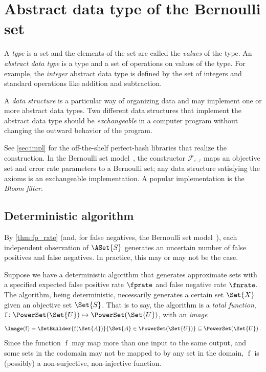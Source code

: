 \documentclass[ ../main.tex]{subfiles}
\begin{document}
\section{Abstract data type of the Bernoulli set}
\label{sec:adt}
A \emph{type} is a set and the elements of the set are called the \emph{values} 
of the type. An \emph{abstract data type} is a type and a set of operations on 
values of the type. For example, the \emph{integer} abstract data type is 
defined by the set of integers and standard operations like addition and 
subtraction.

A \emph{data structure} is a particular way of organizing data and may 
implement one or more abstract data types. Two different data structures that 
implement the abstract data type should be \emph{exchangeable} in a computer
program without changing the outward behavior of the program.

See \cref{sec:impl} for the off-the-shelf perfect-hash libraries that realize
the construction. In the Bernoulli set model~\cite{bsets}, the
constructor $\mathcal{F}_{\varepsilon,\tau}$ maps an objective set and error
rate parameters to a Bernoulli set; any data structure satisfying the axioms is
an exchangeable implementation. A popular implementation is the \emph{Bloom
filter}.

\subsection{Deterministic algorithm}
By \cref{thm:fp_rate} (and, for false negatives, the Bernoulli set
model~\cite{bsets}), each independent observation of $\ASet{S}$ generates
an uncertain number of false positives and false negatives. In practice, this
may or may not be the case.

Suppose we have a deterministic algorithm that generates approximate sets with 
a specified expected false positive rate $\fprate$ and false negative rate 
$\fnrate$. The algorithm, being deterministic, necessarily generates a certain 
set $\Set{X}$ given an objective set $\Set{S}$. That is to say, the algorithm 
is a \emph{total function},
	$\operatorname{f} \colon \PowerSet(\Set{U}) \mapsto \PowerSet(\Set{U})$,
with an \emph{image}
\begin{equation}
\Image(\operatorname{f}) = 
    \SetBuilder{\operatorname{f}(\Set{A})}{\Set{A} \in \PowerSet(\Set{U})}
        \subseteq \PowerSet(\Set{U})\,.
\end{equation}
Since the function $\operatorname{f}$ may map more than one input to the same 
output, and some sets in the codomain may not be mapped to by any set in the 
domain, $\operatorname{f}$ is (possibly) a non-surjective, non-injective 
function.
\end{document}
